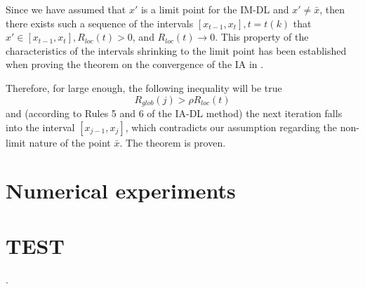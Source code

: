\documentclass[review]{elsarticle}
\begin{document}
	Since we have assumed that $x'$ is a limit point for the IM-DL and  $x' \neq \bar x$, then there exists such a sequence of the intervals $[x_{t-1}, x_t], t=t(k)$ that $x' \in [x_{t-1}, x_t], R_{loc}(t)>0$, and $R_{loc}(t) \rightarrow 0$. This property of the characteristics of the intervals shrinking to the limit point has been established when proving the theorem on the convergence of the IA in \cite{Sergeyev2013}.

	Therefore, for large enough, the following inequality will be true
\begin{equation}
	R_{glob}(j) > \rho R_{loc}(t)
\end{equation}
and (according to Rules 5 and 6 of the IA-DL method) the next iteration falls into the interval $[x_{j-1}, x_j]$, which contradicts our assumption regarding the non-limit nature of the point $\bar x$. The theorem is proven.



\section{Numerical experiments}



\section{TEST}

\cite{Evtushenko1971, Piyavskii1972, Shubert1972, Strongin1970, Evtushenko2009, Evtushenko2013, Strongin2000, Sergeyev2013, Pinter1996, Jones2009, Wood1991, Meewella1988, Mladineo1986, Vaz2009, Stripinis2019, Paulavicius2016, Pillo2012, Pillo2016, Barkalov2017_1, Barkalov2017_2, Sergeyev2006, Zilinskas2008, Sovrasov2019, Kvasov2003, Sergeyev2010,Sergeyev2016, Horst1996, Gablonsky2001, Jones1993, Gaviano2003, Barkalov2018, Paulavicius2014, Sergeyev2015, Strongin2018, Gergel2017_2, Gergel2019}.



\end{document}
